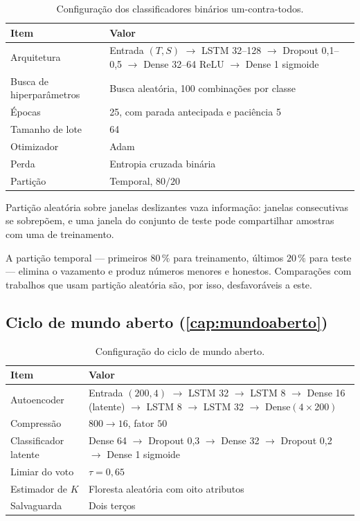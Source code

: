 \begin{table}[htbp]
\centering
\caption{Configuração dos classificadores binários um-contra-todos.}
\label{tab:rep-binarios}
\small
\begin{tabular}{lp{9.4cm}}
\toprule
\textbf{Item} & \textbf{Valor} \\
\midrule
Arquitetura & Entrada $(T,S)$ $\to$ LSTM 32--128 $\to$ Dropout 0,1--0,5 $\to$
Dense 32--64 ReLU $\to$ Dense 1 sigmoide \\
Busca de hiperparâmetros & Busca aleatória, 100 combinações por classe \\
Épocas & 25, com parada antecipada e paciência 5 \\
Tamanho de lote & 64 \\
Otimizador & Adam \\
Perda & Entropia cruzada binária \\
Partição & Temporal, $80/20$ \\
\bottomrule
\end{tabular}
\end{table}

\begin{destaque}
Partição aleatória sobre janelas deslizantes vaza informação: janelas consecutivas se
sobrepõem, e uma janela do conjunto de teste pode compartilhar amostras com uma de
treinamento.

A partição temporal --- primeiros $80\,\%$ para treinamento, últimos $20\,\%$ para teste
--- elimina o vazamento e produz números menores e honestos. Comparações com trabalhos
que usam partição aleatória são, por isso, desfavoráveis a este.
\end{destaque}

\subsection{Ciclo de mundo aberto (\cref{cap:mundoaberto})}

\begin{table}[htbp]
\centering
\caption{Configuração do ciclo de mundo aberto.}
\label{tab:rep-aberto}
\small
\begin{tabular}{lp{9.4cm}}
\toprule
\textbf{Item} & \textbf{Valor} \\
\midrule
Autoencoder & Entrada $(200,4)$ $\to$ LSTM 32 $\to$ LSTM 8 $\to$ Dense 16 (latente)
$\to$ LSTM 8 $\to$ LSTM 32 $\to$ Dense$(4 \times 200)$ \\
Compressão & $800 \to 16$, fator $50$ \\
Classificador latente & Dense 64 $\to$ Dropout 0,3 $\to$ Dense 32 $\to$ Dropout 0,2
$\to$ Dense 1 sigmoide \\
Limiar do voto & $\tau = 0{,}65$ \\
Estimador de $K$ & Floresta aleatória com oito atributos \\
Salvaguarda & Dois terços \\
\bottomrule
\end{tabular}
\end{table}


